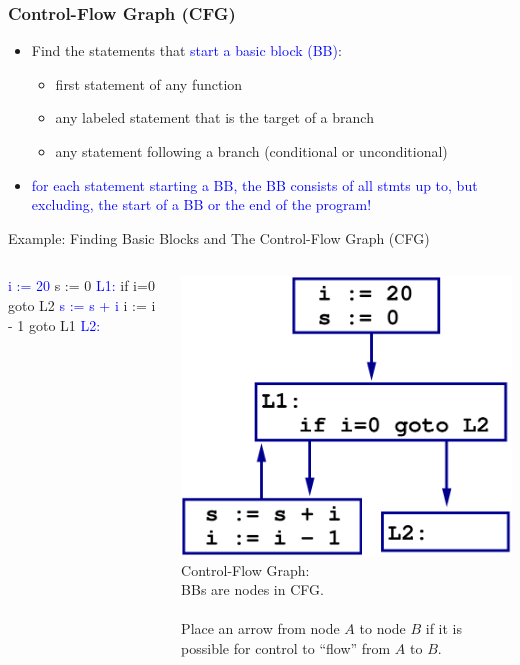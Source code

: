 \documentclass{beamer}
\newcommand{\blue}[1]{\textcolor{Blue}{{#1}}}
\newcommand{\emp}[1]{\textcolor{DikuRed}{ #1}}
\begin{document}
\begin{frame}[fragile,t]
    \frametitle{Control-Flow Graph (CFG)}


\begin{itemize}

\item Find the statements that \blue{start a basic block (BB)}:\smallskip
    \begin{itemize}
        \item first statement of any function

        \item any labeled statement that is the target of a branch

        \item any statement following a branch (conditional or unconditional)\smallskip
    \end{itemize}


\item \blue{for each statement starting a BB, the BB consists of all stmts up
            to, but excluding, the start of a BB or the end of the program!}

\end{itemize}

\bigskip

\begin{block}{Example: Finding Basic Blocks and The Control-Flow Graph (\textsc{CFG})}
\begin{columns}
\begin{colorcode}[fontsize=\scriptsize]
    \blue{i := 20}
    s := 0
\blue{L1:}
    if i=0 \emp{goto L2}
    \blue{s := s + i}
    i := i - 1
    \emp{goto L1}
\blue{L2:}
\end{colorcode} 
\includegraphics[width=25ex]{Figures/CFGeg1}
\emp{Control-Flow Graph:}\\
BBs are nodes in CFG.\\
{\tt~}\\
Place an arrow from
node $A$ to node $B$ if it is
possible for control to
``flow'' from $A$ to $B$.
\end{columns}
\end{block}

\end{frame}
\end{document}
